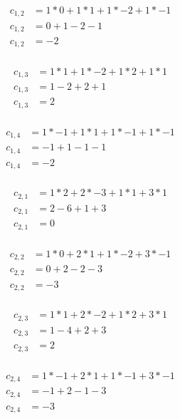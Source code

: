 \documentclass[12pt]{article}
\begin{document}
\begin{itemize}
\begin{align*}
    c_{1,2} &= 1 * 0 + 1 * 1 + 1 * -2 + 1 * -1 \\
    c_{1,2} &= 0 + 1 - 2 - 1 \\
    c_{1,2} &= -2 \\
\end{align*}

\begin{align*}
    c_{1,3} &= 1 * 1 + 1 * -2 + 1 * 2 + 1 * 1 \\
    c_{1,3} &= 1 - 2 + 2 + 1 \\
    c_{1,3} &= 2 \\
\end{align*}

\begin{align*}
    c_{1,4} &= 1 * -1 + 1 * 1 + 1 * -1 + 1 * -1 \\
    c_{1,4} &= -1 + 1 - 1 - 1 \\
    c_{1,4} &= -2 \\
\end{align*}

\begin{align*}
    c_{2,1} &= 1 * 2 + 2 * -3 + 1 * 1 + 3 * 1 \\
    c_{2,1} &= 2 - 6 + 1 + 3 \\
    c_{2,1} &= 0 \\
\end{align*}

\begin{align*}
    c_{2,2} &= 1 * 0 + 2 * 1 + 1 * -2 + 3 * -1 \\
    c_{2,2} &= 0 + 2 - 2 - 3 \\
    c_{2,2} &= -3 \\
\end{align*}

\begin{align*}
    c_{2,3} &= 1 * 1 + 2 * -2 + 1 * 2 + 3 * 1 \\
    c_{2,3} &= 1 - 4 + 2 + 3 \\
    c_{2,3} &= 2 \\
\end{align*}

\begin{align*}
    c_{2,4} &= 1 * -1 + 2 * 1 + 1 * -1 + 3 * -1 \\
    c_{2,4} &= -1 + 2 - 1 - 3 \\
    c_{2,4} &= -3 \\
\end{align*}


\end{itemize}
\end{document}

